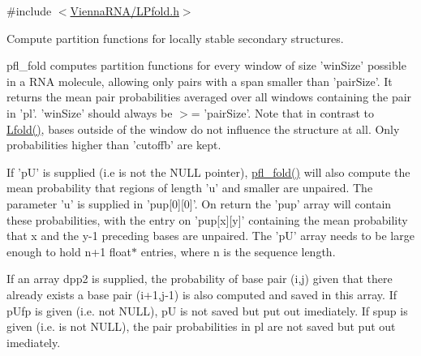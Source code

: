 {\ttfamily \#include $<$\hyperlink{LPfold_8h}{Vienna\+R\+N\+A/\+L\+Pfold.\+h}$>$}



Compute partition functions for locally stable secondary structures. 

pfl\+\_\+fold computes partition functions for every window of size 'win\+Size' possible in a R\+N\+A molecule, allowing only pairs with a span smaller than 'pair\+Size'. It returns the mean pair probabilities averaged over all windows containing the pair in 'pl'. 'win\+Size' should always be $>$= 'pair\+Size'. Note that in contrast to \hyperlink{group__local__mfe__fold_ga16e5a70e60835bb969eaecbe6482f1be}{Lfold()}, bases outside of the window do not influence the structure at all. Only probabilities higher than 'cutoffb' are kept.

If 'p\+U' is supplied (i.\+e is not the N\+U\+L\+L pointer), \hyperlink{group__local__pf__fold_ga7dcf599d07258801ea55e7d14a56908d}{pfl\+\_\+fold()} will also compute the mean probability that regions of length 'u' and smaller are unpaired. The parameter 'u' is supplied in 'pup\mbox{[}0\mbox{]}\mbox{[}0\mbox{]}'. On return the 'pup' array will contain these probabilities, with the entry on 'pup\mbox{[}x\mbox{]}\mbox{[}y\mbox{]}' containing the mean probability that x and the y-\/1 preceding bases are unpaired. The 'p\+U' array needs to be large enough to hold n+1 float$\ast$ entries, where n is the sequence length.

If an array dpp2 is supplied, the probability of base pair (i,j) given that there already exists a base pair (i+1,j-\/1) is also computed and saved in this array. If p\+Ufp is given (i.\+e. not N\+U\+L\+L), p\+U is not saved but put out imediately. If spup is given (i.\+e. is not N\+U\+L\+L), the pair probabilities in pl are not saved but put out imediately.



